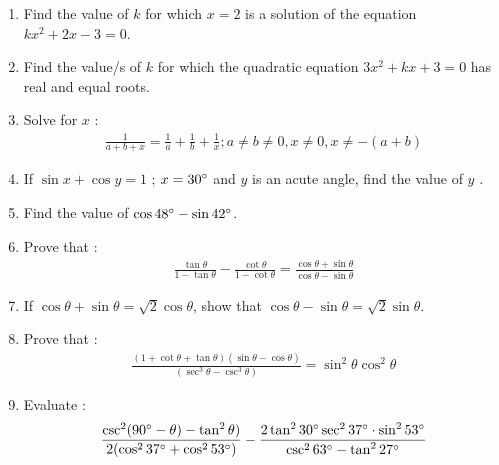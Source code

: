 \begin{enumerate}
\item Find the value of $k$ for which $x = 2$ is a solution of the equation
  $kx^2 + 2x - 3 = 0$.
  
\item Find the value/s of $k$ for which the quadratic equation $3x^{2} + kx + 3 = 0$
has real and equal roots.


\item Solve for $x$ :
\begin{align*}
    {\frac {1}{a+b+x}} = {\frac{1}{a}} + {\frac{1}{b}} + {\frac{1}{x}};  {a\neq b \neq 0},{x \neq 0},{x \neq -(a+b)}
\end{align*}

\item If $\sin{x} + \cos{y}= 1$ ; $x=30\degree$  and  $y$ is an acute angle, find the value of $y$ .

\item Find the value of $\cos {48\degree} - \sin {42\degree}$.

\item Prove that :
\begin{align*}
   {\frac{\tan\theta}{1-\tan\theta}} - {\frac{\cot\theta}{1-\cot\theta}}={\frac{\cos\theta+ \sin\theta}{\cos\theta-\sin\theta}}
\end{align*} 

\item If ${\cos\theta + \sin\theta} = {\sqrt 2}{\cos\theta}$, show that ${\cos\theta - \sin\theta} = {\sqrt 2}{\sin\theta}$.

\item Prove that :
\begin{align*}
    {\frac{(1+\cot\theta+\tan\theta)(\sin\theta-\cos\theta)}{(\sec^3\theta-\csc^3\theta)}} = \sin^2\theta \cos^2\theta
\end{align*}

\item Evaluate :
\begin{align*}
    {\frac{\csc^2(90\degree - \theta)-\tan^2\theta)}{2(\cos^2 37\degree + \cos^2 53\degree)}} - {\frac{2\tan^2 30\degree \sec^2 37\degree \cdot \sin^2 53\degree}{\csc^2 63\degree - \tan^2 27\degree}} 
\end{align*}	
\end{enumerate}
